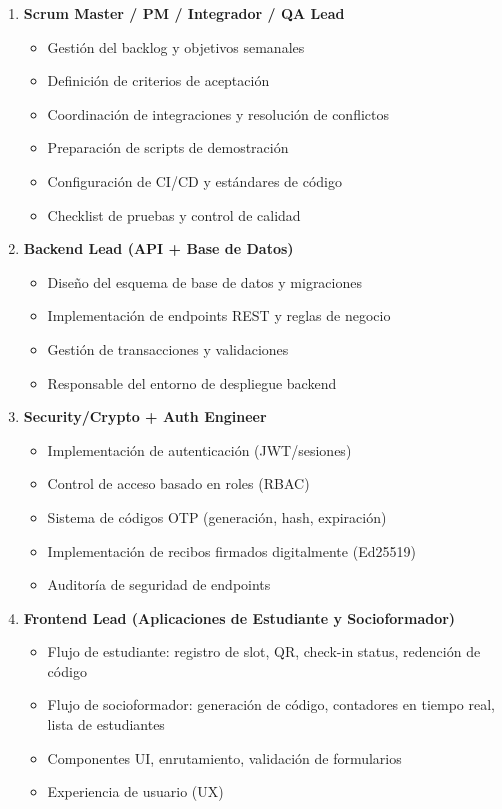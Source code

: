 \documentclass[12pt,a4paper]{article}
\begin{document}
\begin{enumerate}
    \item \textbf{Scrum Master / PM / Integrador / QA Lead}
    \begin{itemize}[leftmargin=*]
        \item Gestión del backlog y objetivos semanales
        \item Definición de criterios de aceptación
        \item Coordinación de integraciones y resolución de conflictos
        \item Preparación de scripts de demostración
        \item Configuración de CI/CD y estándares de código
        \item Checklist de pruebas y control de calidad
    \end{itemize}
    
    \item \textbf{Backend Lead (API + Base de Datos)}
    \begin{itemize}[leftmargin=*]
        \item Diseño del esquema de base de datos y migraciones
        \item Implementación de endpoints REST y reglas de negocio
        \item Gestión de transacciones y validaciones
        \item Responsable del entorno de despliegue backend
    \end{itemize}
    
    \item \textbf{Security/Crypto + Auth Engineer}
    \begin{itemize}[leftmargin=*]
        \item Implementación de autenticación (JWT/sesiones)
        \item Control de acceso basado en roles (RBAC)
        \item Sistema de códigos OTP (generación, hash, expiración)
        \item Implementación de recibos firmados digitalmente (Ed25519)
        \item Auditoría de seguridad de endpoints
    \end{itemize}
    
    \item \textbf{Frontend Lead (Aplicaciones de Estudiante y Socioformador)}
    \begin{itemize}[leftmargin=*]
        \item Flujo de estudiante: registro de slot, QR, check-in status, redención de código
        \item Flujo de socioformador: generación de código, contadores en tiempo real, lista de estudiantes
        \item Componentes UI, enrutamiento, validación de formularios
        \item Experiencia de usuario (UX)
    \end{itemize}
    

\end{enumerate}
\end{document}
